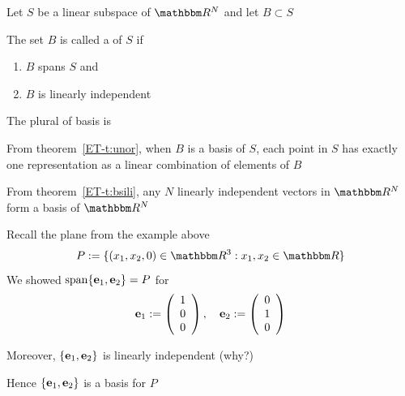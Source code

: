 \begin{frame}

    \vspace{2em}
    Let $S$ be a linear subspace of $\RR^N$ and
    let $B \subset S$
    
    \vspace{.7em}
    The set $B$ is called a  of $S$
    if 
    \begin{enumerate}
        \item $B$ spans $S$ and
        \item $B$ is linearly independent
    \end{enumerate}
    
    \vspace{.7em}
    The plural of basis is 
    
\end{frame}

\begin{frame}
    
    \vspace{2em}
    From theorem~\ref{ET-t:unor}, when
    $B$ is a basis of $S$, each point in $S$ has exactly one representation as a
    linear combination of elements of $B$
    
    \vspace{.7em}
    From theorem~\ref{ET-t:bsili}, any $N$ linearly
    independent vectors in $\RR^N$ form a basis of $\RR^N$
    
\end{frame}

\begin{frame}
    
    \vspace{2em}
    \Eg
    Recall the plane from the example above
    \begin{equation*}
        P := \setntn{(x_1, x_2, 0) \in \RR^3}{ x_1, x_2 \in \RR}
    \end{equation*}
    We showed $\operatorname{span}\{{\mathbf e}_1, {\mathbf e}_2\} = P$ for 
    \begin{equation*}
        {\mathbf e}_1 := 
        \left(
        \begin{array}{c}
            1 \\
            0 \\
            0
        \end{array}
        \right),
        \quad 
        {\mathbf e}_2 := 
        \left(
        \begin{array}{c}
            0 \\
            1 \\
            0
        \end{array}
        \right)
    \end{equation*}
    
    Moreover, $\{{\mathbf e}_1, {\mathbf e}_2\}$ is linearly independent (why?)

    Hence $\{{\mathbf e}_1, {\mathbf e}_2\}$ is a basis for $P$


\end{frame}

